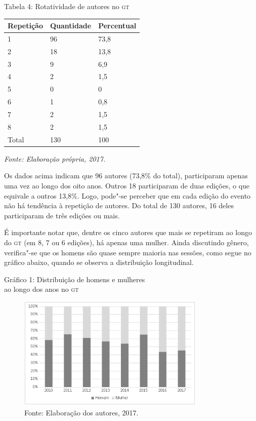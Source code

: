 \pagebreak
\begin{center}
Tabela 4: Rotatividade de autores no \textsc{gt}
\end{center}

\begin{center}
\centering
\begin{tabular}{|l|l|l|}
\hline
\textbf{Repetição} & \textbf{Quantidade} & \textbf{Percentual} \\ \hline
1 & 96 & 73,8 \\ \hline
2 & 18 & 13,8 \\ \hline
3 & 9 & 6,9 \\ \hline
4 & 2 & 1,5 \\ \hline
5 & 0 & 0 \\ \hline
6 & 1 & 0,8 \\ \hline
7 & 2 & 1,5 \\ \hline
8 & 2 & 1,5 \\ \hline
Total & 130 & 100 \\ \hline
\end{tabular}
\end{center}

\begin{center}
{\footnotesize\emph{Fonte: Elaboração própria, 2017.}}
\end{center}

Os dados acima indicam que 96 autores (73,8\% do total), participaram
apenas uma vez ao longo dos oito anos. Outros 18 participaram de duas
edições, o que equivale a outros 13,8\%. Logo, pode"-se perceber que em
cada edição do evento não há tendência à repetição de autores. Do
total de 130 autores, 16 deles participaram de três edições ou
mais.

É importante notar que, dentre os cinco autores que mais se
repetiram ao longo do \textsc{gt} (em 8, 7 ou 6 edições), há apenas uma mulher.
Ainda discutindo gênero, verifica"-se que os homens são quase sempre
maioria nas sessões, como segue no gráfico abaixo, quando se observa a
distribuição longitudinal.

\pagebreak
\begin{center}
Gráfico 1: Distribuição de homens e mulheres\\ ao longo dos anos no \textsc{gt}
\end{center}

\begin{figure}[!ht]
\centering
 \includegraphics[width=90mm]{./imgs/graf3_1.png}
\caption{Fonte: Elaboração dos autores, 2017.}
\end{figure}

